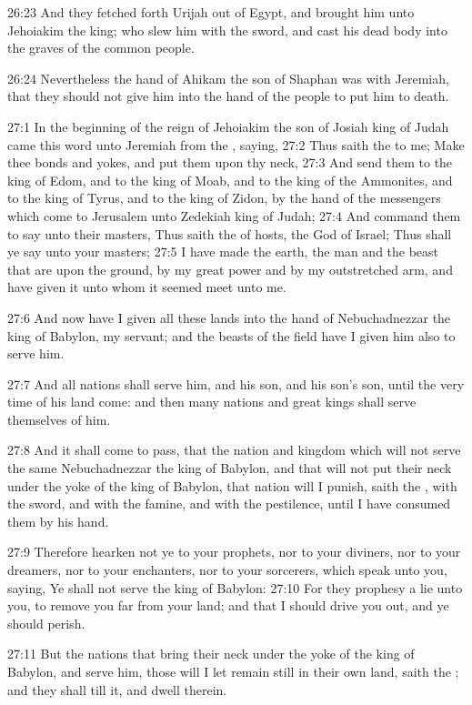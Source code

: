 26:23 And they fetched forth Urijah out of Egypt, and brought him unto
Jehoiakim the king; who slew him with the sword, and cast his dead
body into the graves of the common people.

26:24 Nevertheless the hand of Ahikam the son of Shaphan was with
Jeremiah, that they should not give him into the hand of the people to
put him to death.

27:1 In the beginning of the reign of Jehoiakim the son of Josiah king
of Judah came this word unto Jeremiah from the \LORD, saying, 27:2 Thus
saith the \LORD to me; Make thee bonds and yokes, and put them upon thy
neck, 27:3 And send them to the king of Edom, and to the king of Moab,
and to the king of the Ammonites, and to the king of Tyrus, and to the
king of Zidon, by the hand of the messengers which come to Jerusalem
unto Zedekiah king of Judah; 27:4 And command them to say unto their
masters, Thus saith the \LORD of hosts, the God of Israel; Thus shall
ye say unto your masters; 27:5 I have made the earth, the man and the
beast that are upon the ground, by my great power and by my
outstretched arm, and have given it unto whom it seemed meet unto me.

27:6 And now have I given all these lands into the hand of
Nebuchadnezzar the king of Babylon, my servant; and the beasts of the
field have I given him also to serve him.

27:7 And all nations shall serve him, and his son, and his son's son,
until the very time of his land come: and then many nations and great
kings shall serve themselves of him.

27:8 And it shall come to pass, that the nation and kingdom which will
not serve the same Nebuchadnezzar the king of Babylon, and that will
not put their neck under the yoke of the king of Babylon, that nation
will I punish, saith the \LORD, with the sword, and with the famine,
and with the pestilence, until I have consumed them by his hand.

27:9 Therefore hearken not ye to your prophets, nor to your diviners,
nor to your dreamers, nor to your enchanters, nor to your sorcerers,
which speak unto you, saying, Ye shall not serve the king of Babylon:
27:10 For they prophesy a lie unto you, to remove you far from your
land; and that I should drive you out, and ye should perish.

27:11 But the nations that bring their neck under the yoke of the king
of Babylon, and serve him, those will I let remain still in their own
land, saith the \LORD; and they shall till it, and dwell therein.

